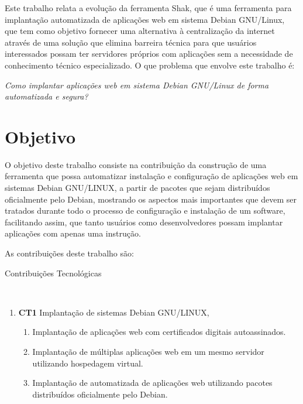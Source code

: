 Este trabalho relata a evolução da ferramenta Shak, que é uma ferramenta para implantação
automatizada de aplicações web em sistema Debian GNU/Linux, que tem como objetivo fornecer
uma alternativa à centralização da internet através de uma solução que elimina
barreira técnica para que usuários interessados possam ter servidores próprios
com aplicações sem a necessidade de conhecimento
técnico especializado. O que problema que envolve este trabalho é:

\begin{center}
  \textit{
  Como implantar aplicações web em sistema Debian GNU/Linux de forma automatizada
  e segura?
}
\end{center}

\section{Objetivo}

O objetivo deste trabalho consiste na contribuição da construção de uma ferramenta
que possa automatizar instalação e configuração de aplicações web em sistemas
Debian GNU/LINUX, a partir de pacotes que sejam distribuídos oficialmente pelo
Debian, mostrando os aspectos mais importantes que devem ser tratados durante
todo o processo de configuração e instalação de um software, facilitando assim, que
tanto usuários como desenvolvedores possam implantar aplicações com apenas uma
instrução.

As contribuições deste trabalho são:

\begin{description}
  \item [Contribuições Tecnológicas]\
\end{description}
    \begin{enumerate}
      \item \textbf{CT1} Implantação de sistemas Debian GNU/LINUX,
        \begin{enumerate}
          \item Implantação de aplicações web com certificados digitais autoassinados.
          \item Implantação de múltiplas aplicações web em um mesmo servidor utilizando
          hospedagem virtual.
          \item Implantação de automatizada de aplicações web utilizando pacotes
          distribuídos oficialmente pelo Debian.
        \end{enumerate}
    \end{enumerate}

